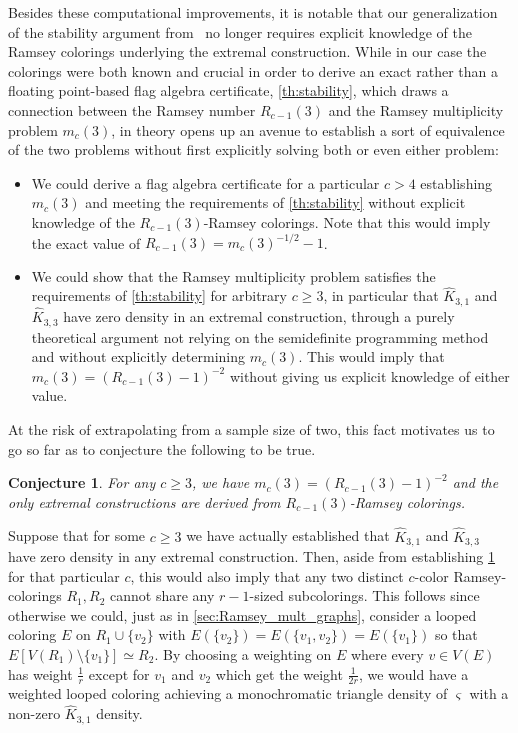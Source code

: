 \documentclass[a4paper,11pt]{article}
\newtheorem{conjecture}[theorem]{Conjecture}
\numberwithin{equation}{section}
\begin{document}
Besides these computational improvements, it is notable that our generalization of the stability argument from~\cite{CummingsEtAl_2013} no longer requires explicit knowledge of the Ramsey colorings underlying the extremal construction. While in our case the colorings were both known and crucial in order to derive an exact rather than a floating point-based flag algebra certificate, \cref{th:stability}, which draws a connection between the Ramsey number $R_{c-1}(3)$ and the Ramsey multiplicity problem $m_c(3)$, in theory opens up an avenue to establish a sort of equivalence of the two problems without first explicitly solving both or even either problem: 

\begin{itemize} \setlength\itemsep{0em}
    \item[1)] We could derive a flag algebra certificate for a particular $c > 4$ establishing $m_c(3)$ and meeting the requirements of \cref{th:stability} without explicit knowledge of the $R_{c-1}(3)$-Ramsey colorings. Note that this would imply the exact value of $R_{c-1}(3) = m_c(3)^{-1/2} - 1$.
    \item[2)] We could show that the Ramsey multiplicity problem satisfies the requirements of \cref{th:stability} for arbitrary $c \geq 3$, in particular that $\hat K_{3,1}$ and $\hat K_{3,3}$ have zero density in an extremal construction, through a purely theoretical argument not relying on the semidefinite programming method and without explicitly determining $m_c(3)$. This would imply that $m_c(3) = (R_{c-1}(3) - 1)^{-2}$ without giving us explicit knowledge of either value.
\end{itemize}

At the risk of extrapolating from a sample size of two, this fact motivates us to go so far as to conjecture the following to be true.
%
\begin{conjecture}\label{conj:equivalence}
    For any $c \geq 3$, we have $m_c(3) = (R_{c-1}(3) - 1)^{-2}$ and the only extremal constructions are derived from $R_{c-1}(3)$-Ramsey colorings.
\end{conjecture}
%
Suppose that for some $c\ge 3$ we have actually established that $\hat K_{3,1}$ and $\hat K_{3,3}$ have zero density in any extremal construction. Then, aside from establishing \cref{conj:equivalence} for that particular $c$, this would also imply that any two distinct $c$-color Ramsey-colorings $R_1, R_2$ cannot share any $r-1$-sized subcolorings. This follows since otherwise we could, just as in \cref{sec:Ramsey_mult_graphs}, consider a looped coloring $E$ on $R_1\cup \{v_2\}$ with $E(\{v_2\})=E(\{v_1,v_2\})=E(\{v_1\})$ so that $E[V(R_1)\setminus \{v_1\}]\simeq R_2$. By choosing a weighting on $E$ where every $v\in V(E)$ has weight $\frac{1}{r}$ except for $v_1$ and $v_2$ which get the weight $\frac{1}{2r}$, we would have a weighted looped coloring achieving a monochromatic triangle density of $\varsigma$ with a non-zero $\hat K_{3,1}$ density.
\end{document}
